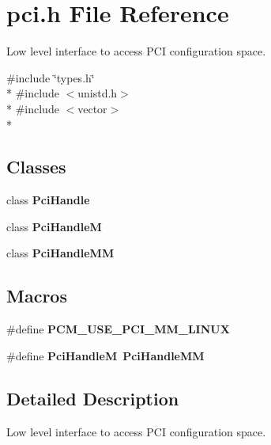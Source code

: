 \section{pci.\+h File Reference}
\label{pci_8h}


Low level interface to access P\+CI configuration space.  


{\ttfamily \#include \char`\"{}types.\+h\char`\"{}}\\*
{\ttfamily \#include $<$unistd.\+h$>$}\\*
{\ttfamily \#include $<$vector$>$}\\*
\subsection*{Classes}
\begin{DoxyCompactItemize}
\item 
class {\bf Pci\+Handle}
\item 
class {\bf Pci\+HandleM}
\item 
class {\bf Pci\+Handle\+MM}
\end{DoxyCompactItemize}
\subsection*{Macros}
\begin{DoxyCompactItemize}
\item 
\#define {\bfseries P\+C\+M\+\_\+\+U\+S\+E\+\_\+\+P\+C\+I\+\_\+\+M\+M\+\_\+\+L\+I\+N\+UX}\label{pci_8h_a971b727353c43affea5aeaca4748371a}

\item 
\#define {\bfseries Pci\+HandleM}~{\bf Pci\+Handle\+MM}\label{pci_8h_a4933174ae6640df9fb81a25f36218314}

\end{DoxyCompactItemize}


\subsection{Detailed Description}
Low level interface to access P\+CI configuration space. 

